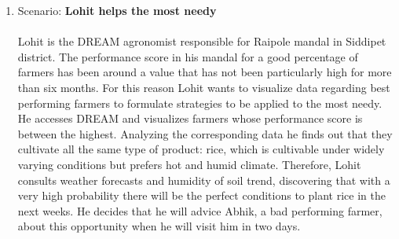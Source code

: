 \begin{enumerate}
\item Scenario: \textbf{Lohit helps the most needy}\\\\
Lohit is the DREAM agronomist responsible for Raipole mandal in Siddipet district. The performance score in his mandal for a good percentage of farmers has been around a value that has not been particularly high for more than six months. For this reason Lohit wants to visualize data regarding best performing farmers to formulate strategies to be applied to the most needy. He accesses DREAM and visualizes farmers whose performance score is between the highest. Analyzing the corresponding data he finds out that they cultivate all the same type of product: rice, which is cultivable under widely varying conditions but prefers hot and humid climate. Therefore, Lohit consults weather forecasts and humidity of soil trend, discovering that with a very high probability there will be the perfect conditions to plant rice in the next weeks. He decides that he will advice Abhik, a bad performing farmer, about this opportunity when he will visit him in two days. 
\\

\end{enumerate}

\newpage